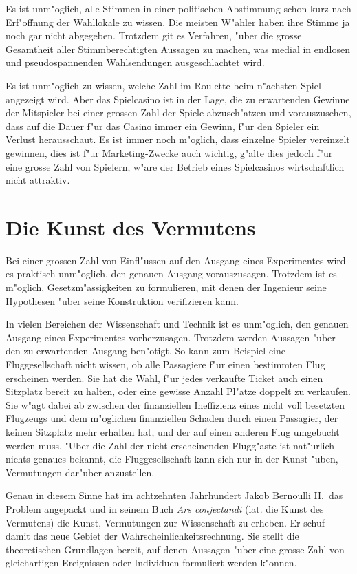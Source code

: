 Es ist unm"oglich, alle Stimmen in einer politischen Abstimmung
schon kurz nach Erf"offnung der Wahllokale zu wissen. Die meisten
W"ahler haben ihre Stimme ja noch gar nicht abgegeben. Trotzdem git
es Verfahren, "uber die grosse Gesamtheit aller Stimmberechtigten
Aussagen zu machen, was medial in endlosen und pseudospannenden
Wahlsendungen ausgeschlachtet wird.

Es ist unm"oglich zu wissen, welche Zahl im Roulette beim n"achsten
Spiel angezeigt wird. Aber das Spielcasino ist in der Lage, die
zu erwartenden Gewinne der Mitspieler bei einer grossen Zahl der
Spiele abzusch"atzen und vorauszusehen, dass auf die Dauer f"ur
das Casino immer ein Gewinn, f"ur den Spieler ein Verlust herausschaut.
Es ist immer noch m"oglich, dass einzelne Spieler vereinzelt
gewinnen, dies ist f"ur Marketing-Zwecke auch wichtig, g"alte
dies jedoch f"ur eine grosse Zahl von Spielern, w"are der Betrieb
eines Spielcasinos wirtschaftlich nicht attraktiv.

\section*{Die Kunst des Vermutens}
Bei einer grossen Zahl von Einfl"ussen auf den Ausgang eines Experimentes
wird es praktisch unm"oglich, den genauen Ausgang vorauszusagen.
Trotzdem ist es m"oglich, Gesetzm"assigkeiten zu formulieren, mit
denen der Ingenieur seine Hypothesen "uber seine Konstruktion
verifizieren kann.

In vielen Bereichen der Wissenschaft und Technik ist es unm"oglich, den
genauen Ausgang eines Experimentes vorherzusagen. Trotzdem werden
Aussagen "uber den zu erwartenden Ausgang ben"otigt. So kann zum Beispiel
eine Fluggesellschaft nicht wissen, ob alle Passagiere f"ur einen
bestimmten Flug erscheinen werden. Sie hat die Wahl, f"ur jedes verkaufte
Ticket auch einen Sitzplatz bereit zu halten, oder eine gewisse Anzahl
Pl"atze doppelt zu verkaufen. Sie w"agt dabei ab zwischen der finanziellen
Ineffizienz eines nicht voll besetzten Flugzeugs und dem m"oglichen
finanziellen Schaden durch einen Passagier, der keinen Sitzplatz mehr
erhalten hat, und der auf einen anderen Flug umgebucht werden muss.
"Uber die Zahl der nicht erscheinenden Flugg"aste ist nat"urlich nichts
genaues bekannt, die Fluggesellschaft kann sich nur in der Kunst "uben,
Vermutungen dar"uber anzustellen.

Genau in diesem Sinne hat im achtzehnten Jahrhundert
Jakob Bernoulli II.~das Problem angepackt und in seinem Buch
{\em Ars conjectandi} (lat. die Kunst des Vermutens) die Kunst,
Vermutungen zur Wissenschaft zu erheben. Er schuf damit das
neue Gebiet der Wahrscheinlichkeitsrechnung. Sie stellt die theoretischen Grundlagen
bereit, auf denen Aussagen "uber eine grosse Zahl von gleichartigen
Ereignissen oder Individuen formuliert werden k"onnen.

